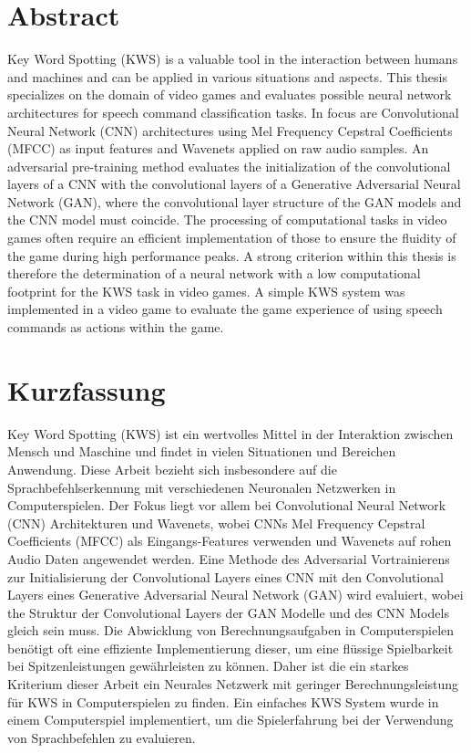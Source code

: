 
\chapter*{Abstract}\label{sec:shards_abstract}
Key Word Spotting (KWS) is a valuable tool in the interaction between humans and machines and can be applied in various situations and aspects.
This thesis specializes on the domain of video games and evaluates possible neural network architectures for speech command classification tasks.
In focus are Convolutional Neural Network (CNN) architectures using Mel Frequency Cepstral Coefficients (MFCC) as input features and Wavenets applied on raw audio samples.
An adversarial pre-training method evaluates the initialization of the convolutional layers of a CNN with the convolutional layers of a Generative Adversarial Neural Network (GAN), where the convolutional layer structure of the GAN models and the CNN model must coincide.
The processing of computational tasks in video games often require an efficient implementation of those to ensure the fluidity of the game during high performance peaks.
A strong criterion within this thesis is therefore the determination of a neural network with a low computational footprint for the KWS task in video games.
A simple KWS system was implemented in a video game to evaluate the game experience of using speech commands as actions within the game.



\chapter*{Kurzfassung}
Key Word Spotting (KWS) ist ein wertvolles Mittel in der Interaktion zwischen Mensch und Maschine und findet in vielen Situationen und Bereichen Anwendung.
Diese Arbeit bezieht sich insbesondere auf die Sprachbefehlserkennung mit verschiedenen Neuronalen Netzwerken in Computerspielen.
Der Fokus liegt vor allem bei Convolutional Neural Network (CNN) Architekturen und Wavenets, wobei CNNs Mel Frequency Cepstral Coefficients (MFCC) als Eingangs-Features verwenden und Wavenets auf rohen Audio Daten angewendet werden.
Eine Methode des Adversarial Vortrainierens zur Initialisierung der Convolutional Layers eines CNN mit den Convolutional Layers eines Generative Adversarial Neural Network (GAN) wird evaluiert, wobei the Struktur der Convolutional Layers der GAN Modelle und des CNN Models gleich sein muss.
Die Abwicklung von Berechnungsaufgaben in Computerspielen benötigt oft eine effiziente Implementierung dieser, um eine flüssige Spielbarkeit bei Spitzenleistungen gewährleisten zu können.
Daher ist die ein starkes Kriterium dieser Arbeit ein Neurales Netzwerk mit geringer Berechnungsleistung für KWS in Computerspielen zu finden.
Ein einfaches KWS System wurde in einem Computerspiel implementiert, um die Spielerfahrung bei der Verwendung von Sprachbefehlen zu evaluieren.